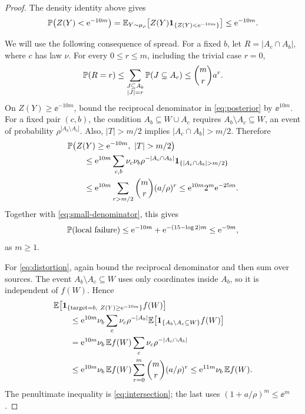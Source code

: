\begin{proof}
The density identity above gives
\begin{equation}\label{eq:small-denominator}
 \mathbb P\bigl(Z(Y)<\mathrm e^{-10m}\bigr)
 =\mathbb E_{Y\sim\mu_\rho}
   \bigl[Z(Y)\mathbf 1_{\{Z(Y)<\mathrm e^{-10m}\}}\bigr]
 \le\mathrm e^{-10m}.
\end{equation}

We will use the following consequence of spread. For a fixed $b$,
let $R=|A_c\cap A_b|$, where $c$ has law $\nu$. For every
$0\le r\le m$, including the trivial case $r=0$,
\begin{equation}\label{eq:intersection}
 \mathbb P(R=r)
 \le\sum_{\substack{J\subseteq A_b\\|J|=r}}
        \mathbb P(J\subseteq A_c)
 \le\binom mr a^r.
\end{equation}
On $Z(Y)\ge\ee^{-10m}$, bound the reciprocal denominator in
\eqref{eq:posterior} by $\ee^{10m}$. For a fixed pair $(c,b)$,
the condition $A_b\subseteq W\cup A_c$ requires
$A_b\setminus A_c\subseteq W$, an event of probability
$\rho^{|A_b\setminus A_c|}$. Also, $|T|>m/2$ implies
$|A_c\cap A_b|>m/2$. Therefore
\begin{align*}
 &\PP\bigl(Z(Y)\ge\ee^{-10m},\ |T|>m/2\bigr)\\
 &\qquad\le
 \ee^{10m}\sum_{c,b}\nu_c\nu_b
 \rho^{-|A_c\cap A_b|}
 \ind_{\{|A_c\cap A_b|>m/2\}}\\
 &\qquad\le
 \ee^{10m}\sum_{r>m/2}\binom mr(a/\rho)^r
 \le \ee^{10m}2^m\ee^{-25m}.
\end{align*}
Together with \eqref{eq:small-denominator}, this gives
\[
 \mathbb P(\text{local failure})
 \le\mathrm e^{-10m}+\mathrm e^{-(15-\log 2)m}
 \le\mathrm e^{-9m},
\]
as $m\ge1$.

For \eqref{eq:distortion}, again bound the reciprocal denominator
and then sum over sources. The event
$A_b\setminus A_c\subseteq W$ uses only coordinates inside $A_b$,
so it is independent of $f(W)$. Hence
\begin{align*}
 &\mathbb E\!\left[
 \mathbf 1_{\{\mathrm{target}=b,\ Z(Y)\ge\mathrm e^{-10m}\}} f(W)
 \right]\\
 &\qquad\le
 \mathrm e^{10m}\nu_b\sum_c\nu_c\rho^{-|A_b|}
       \mathbb E\bigl[\mathbf 1_{\{A_b\setminus A_c\subseteq W\}}f(W)\bigr]\\
 &\qquad=
 \mathrm e^{10m}\nu_b\,\mathbb E f(W)
       \sum_c\nu_c\rho^{-|A_c\cap A_b|}\\
 &\qquad\le
 \mathrm e^{10m}\nu_b\,\mathbb E f(W)
       \sum_{r=0}^m\binom mr(a/\rho)^r
 \le\mathrm e^{11m}\nu_b\,\mathbb E f(W).
\end{align*}
The penultimate inequality is \eqref{eq:intersection}; the last uses
$(1+a/\rho)^m\le\ee^m$.
\end{proof}
